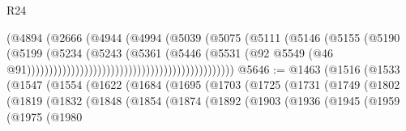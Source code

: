 \begin{lexlean}{R24}
\begin{coremodule}
                                                              (@4894
                                                                (@2666
                                                                  (@4944
                                                                    (@4994
                                                                      (@5039
                                                                        (@5075
                                                                          (@5111
                                                                            (@5146
                                                                              (@5155
                                                                                (@5190
                                                                                  (@5199
                                                                                    (@5234
                                                                                      (@5243
                                                                                        (@5361
                                                                                          (@5446
                                                                                            (@5531
                                                                                              (@92
                                                                                                @5549
                                                                                                (@46
                                                                                                  @91)))))))))))))))))))))))))))))))))))))))))))))))
@5646 := @1463
    (@1516
      (@1533
        (@1547
          (@1554
            (@1622
              (@1684
                (@1695
                  (@1703
                    (@1725
                      (@1731
                        (@1749
                          (@1802
                            (@1819
                              (@1832
                                (@1848
                                  (@1854
                                    (@1874
                                      (@1892
                                        (@1903
                                          (@1936
                                            (@1945
                                              (@1959
                                                (@1975
                                                  (@1980

\end{coremodule}
\end{lexlean}
